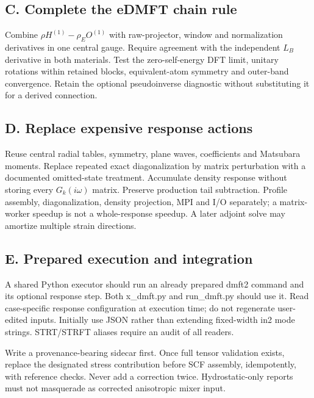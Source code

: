 \documentclass[11pt]{article}
\begin{document}
\subsection*{C. Complete the eDMFT chain rule}
Combine $\rho H^{(1)}-\rho_E O^{(1)}$ with raw-projector, window and normalization derivatives in one central gauge. Require agreement with the independent $L_B$ derivative in both materials. Test the zero-self-energy DFT limit, unitary rotations within retained blocks, equivalent-atom symmetry and outer-band convergence. Retain the optional pseudoinverse diagnostic without substituting it for a derived connection.

\subsection*{D. Replace expensive response actions}
Reuse central radial tables, symmetry, plane waves, coefficients and Matsubara moments. Replace repeated exact diagonalization by matrix perturbation with a documented omitted-state treatment. Accumulate density response without storing every $G_k(i\omega)$ matrix. Preserve production tail subtraction. Profile assembly, diagonalization, density projection, MPI and I/O separately; a matrix-worker speedup is not a whole-response speedup. A later adjoint solve may amortize multiple strain directions.

\subsection*{E. Prepared execution and integration}
A shared Python executor should run an already prepared dmft2 command and its optional response step. Both x\_dmft.py and run\_dmft.py should use it. Read case-specific response configuration at execution time; do not regenerate user-edited inputs. Initially use JSON rather than extending fixed-width in2 mode strings. STRT/STRFT aliases require an audit of all readers.

Write a provenance-bearing sidecar first. Once full tensor validation exists, replace the designated stress contribution before SCF assembly, idempotently, with reference checks. Never add a correction twice. Hydrostatic-only reports must not masquerade as corrected anisotropic mixer input.
\end{document}

